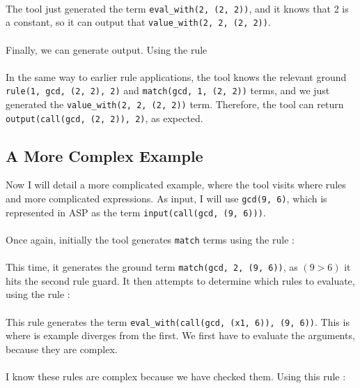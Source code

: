 
\mbox{} \\
The tool just generated the term \lstinline{eval_with(2, (2, 2))}, and it knows that 2 is a constant, so it can output that \lstinline{value_with(2, 2, (2, 2))}. \\ \\
Finally, we can generate output. Using the rule \\


\mbox{} \\
In the same way to earlier rule applications, the tool knows the relevant ground \lstinline{rule(1, gcd, (2, 2), 2)} and \lstinline{match(gcd, 1, (2, 2))} terms, and we just generated the \lstinline{value_with(2, 2, (2, 2))} term. Therefore, the tool can return \lstinline{output(call(gcd, (2, 2)), 2)}, as expected.

\subsection{A More Complex Example}
Now I will detail a more complicated example, where the tool visits where rules and more complicated expressions. As input, I will use \lstinline{gcd(9, 6)}, which is represented in ASP as the term \lstinline{input(call(gcd, (9, 6)))}. \\ \\
Once again, initially the tool generates \lstinline{match} terms using the rule : \\ %


\mbox{} \\
This time, it generates the ground term \lstinline{match(gcd, 2, (9, 6))}, as $(9 > 6)$ it hits the second rule guard. It then attempts to determine which rules to evaluate, using the rule : \\ %


\mbox{} \\
This rule generates the term \lstinline{eval_with(call(gcd, (x1, 6)), (9, 6))}. This is where is example diverges from the first. We first have to evaluate the arguments, because they are complex. \\ \\%
I know these rules are complex because we have checked them. Using this rule : \\

